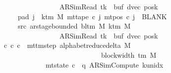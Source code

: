 \begin{isabellebody}
\ \ \ \ \ \ \ \ \ \ \ \ \ \ \ \ \ \ \ {\isacharparenleft}{\kern0pt}AR{\isacharunderscore}{\kern0pt}SimRead{\isacharcomma}{\kern0pt}\ tk{\isacharcomma}{\kern0pt}\ {}{\isacharcomma}{\kern0pt}\ buf{\isacharcomma}{\kern0pt}\ dvec{\isacharcomma}{\kern0pt}\ posk{\isacharparenright}{\kern0pt}{\isachardoublequoteclose}\isanewline
\ \ \ \ \ \ \ pad{}{\isacharcolon}{\kern0pt}\ {\isachardoublequoteopen}{\isasymforall}j\ {\isasymge}\ k{\isacharunderscore}{\kern0pt}tm\ M{\isachardot}{\kern0pt}\ mt{\isacharunderscore}{\kern0pt}tape\ c{\isacharprime}{\kern0pt}\ j\ {\isacharparenleft}{\kern0pt}mt{\isacharunderscore}{\kern0pt}pos\ c{\isacharprime}{\kern0pt}\ j{\isacharparenright}{\kern0pt}\ {\isacharequal}{\kern0pt}\ BLANK{}{\isachardoublequoteclose}\isanewline
\ \ \ \ \ \ \ src{}{\isacharcolon}{\kern0pt}\ {\isachardoublequoteopen}ar{\isacharunderscore}{\kern0pt}stage{\isacharunderscore}{\kern0pt}bounded\ {\isacharparenleft}{\kern0pt}bl{\isacharunderscore}{\kern0pt}tm\ M{\isacharparenright}{\kern0pt}\ {\isacharparenleft}{\kern0pt}k{\isacharunderscore}{\kern0pt}tm\ M{\isacharparenright}{\kern0pt}\isanewline
\ \ \ \ \ \ \ \ \ \ \ \ \ \ \ \ \ \ \ {\isacharparenleft}{\kern0pt}AR{\isacharunderscore}{\kern0pt}SimRead{\isacharcomma}{\kern0pt}\ tk{\isacharcomma}{\kern0pt}\ {}{\isacharcomma}{\kern0pt}\ buf{\isacharcomma}{\kern0pt}\ dvec{\isacharcomma}{\kern0pt}\ posk{\isacharparenright}{\kern0pt}{\isachardoublequoteclose}\isanewline
\ \ \ {\isachardoublequoteopen}{\isasymexists}c{\isacharprime}{\kern0pt}{\isacharprime}{\kern0pt}{\isachardot}{\kern0pt}\ {\isacharparenleft}{\kern0pt}c{\isacharprime}{\kern0pt}{\isacharcomma}{\kern0pt}\ c{\isacharprime}{\kern0pt}{\isacharprime}{\kern0pt}{\isacharparenright}{\kern0pt}\ {\isasymin}\ {\isacharparenleft}{\kern0pt}mttm{\isacharunderscore}{\kern0pt}step\ {\isacharparenleft}{\kern0pt}alphabet{\isacharunderscore}{\kern0pt}reduce{\isacharunderscore}{\kern0pt}delta\ M{\isacharparenright}{\kern0pt}{\isacharparenright}{\kern0pt}\isanewline
\ \ \ \ \ \ \ \ \ \ \ \ \ \ \ \ \ \ \ \ \ \ \ \ \ \ \ \ \ \ {\isacharcircum}{\kern0pt}{\isacharcircum}{\kern0pt}\ {\isacharparenleft}{\kern0pt}block{\isacharunderscore}{\kern0pt}width\ {\isacharparenleft}{\kern0pt}{\isasymGamma}{\isacharunderscore}{\kern0pt}tm\ M{\isacharparenright}{\kern0pt}\ {\isacharplus}{\kern0pt}\ {}{\isacharparenright}{\kern0pt}\isanewline
\ \ \ \ \ \ \ \ \ \ \ \ \ \ {\isasymand}\ mt{\isacharunderscore}{\kern0pt}state\ c{\isacharprime}{\kern0pt}{\isacharprime}{\kern0pt}\ {\isacharequal}{\kern0pt}\ {\isacharparenleft}{\kern0pt}q{\isacharcomma}{\kern0pt}\ AR{\isacharunderscore}{\kern0pt}SimCompute{\isacharcomma}{\kern0pt}\ k{\isacharunderscore}{\kern0pt}unidx\ {}{\isacharcomma}{\kern0pt}\ {}{\isacharcomma}{\kern0pt}\isanewline

\end{isabellebody}

